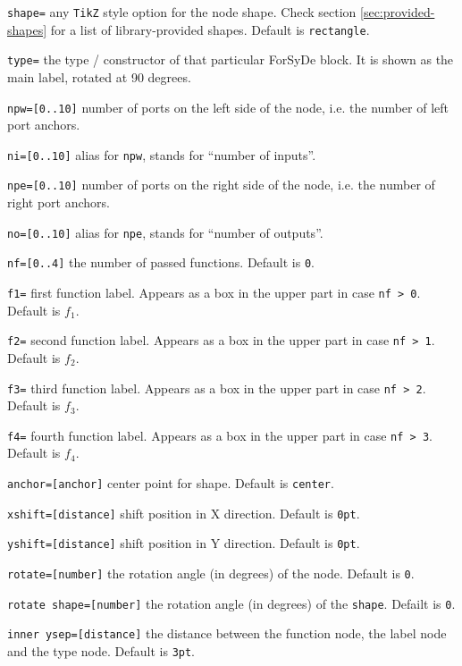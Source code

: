 \begin{optionslist}
\item \texttt{shape=} any \texttt{TikZ} style option for the node shape. Check section \ref{sec:provided-shapes} for a list of library-provided shapes. Default is \texttt{rectangle}.
\item \texttt{type=} the type / constructor of that particular ForSyDe block. It is shown as the main label, rotated at 90 degrees.
\item \texttt{npw=[0..10]} number of ports on the left side of the node, i.e. the number of left port anchors.
\item \texttt{ni=[0..10]} alias for \texttt{npw}, stands for ``number of inputs''.
\item \texttt{npe=[0..10]} number of ports on the right side of the node, i.e. the number of right port anchors.
\item \texttt{no=[0..10]} alias for \texttt{npe}, stands for ``number of outputs''.
\item \texttt{nf=[0..4]} the number of passed functions. Default is \texttt{0}.
\item \texttt{f1=} first function label. Appears as a box in the upper part in case \texttt{nf > 0}. Default is $f_1$.
\item \texttt{f2=} second function label. Appears as a box in the upper part in case \texttt{nf > 1}. Default is $f_2$.
\item \texttt{f3=} third function label. Appears as a box in the upper part in case \texttt{nf > 2}. Default is $f_3$.
\item \texttt{f4=} fourth function label. Appears as a box in the upper part in case \texttt{nf > 3}. Default is $f_4$.
\item \texttt{anchor=[anchor]} center point for shape. Default is \texttt{center}.
\item \texttt{xshift=[distance]} shift position in X direction. Default is \texttt{0pt}.
\item \texttt{yshift=[distance]} shift position in Y direction. Default is \texttt{0pt}.
\item \texttt{rotate=[number]} the rotation angle (in degrees) of the node. Default is \texttt{0}.
\item \texttt{rotate shape=[number]} the rotation angle (in degrees) of the \texttt{shape}. Defailt is \texttt{0}.
\item \texttt{inner ysep=[distance]} the distance between the function node, the label node and the type node. Default is \texttt{3pt}.
\end{optionslist}

